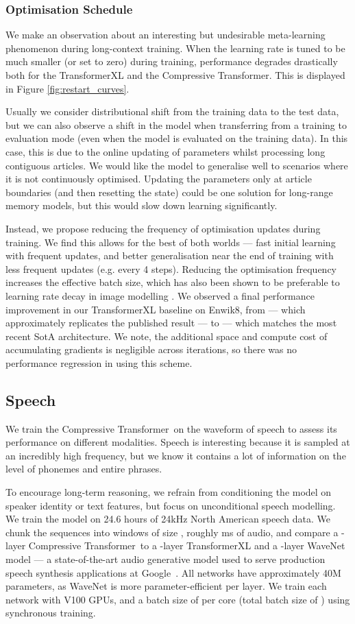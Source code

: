 \documentclass{article} \usepackage{iclr2020_conference,times}
\newcommand{\model}{Compressive Transformer}
\begin{document}
\subsubsection{Optimisation Schedule}
\label{section:optimisation}
We make an observation about an interesting but undesirable meta-learning phenomenon during long-context training. When the learning rate is tuned to be much smaller (or set to zero) during training, performance degrades drastically both for the TransformerXL and the \model. This is displayed in Figure \ref{fig:restart_curves}.  

Usually we consider distributional shift from the training data to the test data, but we can also observe a shift in the model when transferring from a training to evaluation mode (even when the model is evaluated on the training data). In this case, this is due to the online updating of parameters whilst processing long contiguous articles. We would like the model to generalise well to scenarios where it is not continuously optimised. Updating the parameters only at article boundaries (and then resetting the state) could be one solution for long-range memory models, but this would slow down learning significantly. 

Instead, we propose reducing the frequency of optimisation updates during training. We find this allows for the best of both worlds --- fast initial learning with frequent updates, and better generalisation near the end of training with less frequent updates (e.g. every 4 steps). Reducing the optimisation frequency increases the effective batch size, which has also been shown to be preferable to learning rate decay in image modelling \citep{smithdecay2018}. We observed a final performance improvement in our TransformerXL baseline on Enwik8, from  --- which approximately replicates the published result --- to  --- which matches the most recent SotA architecture. 
We note, the additional space and compute cost of accumulating gradients is negligible across iterations, so there was no performance regression in using this scheme.
\subsection{Speech}
We train the \model~on the waveform of speech to assess its performance on different modalities. Speech is interesting because it is sampled at an incredibly high frequency, but we know it contains a lot of information on the level of phonemes and entire phrases.

To encourage long-term reasoning, we refrain from conditioning the model on speaker identity or text features, but focus on unconditional speech modelling. We train the model on 24.6 hours of 24kHz North American speech data. We chunk the sequences into windows of size , roughly ms of audio, and compare a -layer \model~to a -layer TransformerXL and a -layer WaveNet model \citep{oord2016wavenet} --- a state-of-the-art audio generative model used to serve production speech synthesis applications at Google~\citep{oord2018parallel}. All networks have approximately 40M parameters, as WaveNet is more parameter-efficient per layer. We train each network with  V100 GPUs, and a batch size of  per core (total batch size of ) using synchronous training.
\end{document}
